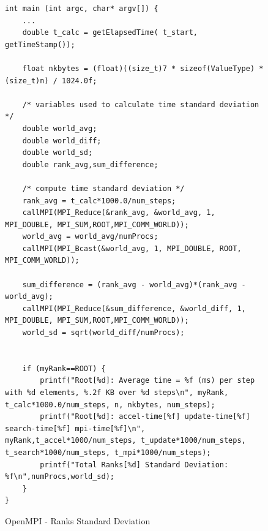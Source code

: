 \documentclass[12pt]{article} %
\begin{document}
\begin{figure}[]
\caption{OpenMPI - Ranks Standard Deviation}\label{fig:benchmark01}
\begin{lstlisting}
int main (int argc, char* argv[]) {
	...
    double t_calc = getElapsedTime( t_start, getTimeStamp());
    
    float nkbytes = (float)((size_t)7 * sizeof(ValueType) * (size_t)n) / 1024.0f;
    
    /* variables used to calculate time standard deviation */
    double world_avg;
    double world_diff;
    double world_sd;
    double rank_avg,sum_difference;
    
    /* compute time standard deviation */
    rank_avg = t_calc*1000.0/num_steps;
    callMPI(MPI_Reduce(&rank_avg, &world_avg, 1, MPI_DOUBLE, MPI_SUM,ROOT,MPI_COMM_WORLD));
    world_avg = world_avg/numProcs;
    callMPI(MPI_Bcast(&world_avg, 1, MPI_DOUBLE, ROOT, MPI_COMM_WORLD));
    
    sum_difference = (rank_avg - world_avg)*(rank_avg - world_avg);
    callMPI(MPI_Reduce(&sum_difference, &world_diff, 1, MPI_DOUBLE, MPI_SUM,ROOT,MPI_COMM_WORLD));
    world_sd = sqrt(world_diff/numProcs);
    
    
    if (myRank==ROOT) {
        printf("Root[%d]: Average time = %f (ms) per step with %d elements, %.2f KB over %d steps\n", myRank, t_calc*1000.0/num_steps, n, nkbytes, num_steps);
        printf("Root[%d]: accel-time[%f] update-time[%f] search-time[%f] mpi-time[%f]\n", myRank,t_accel*1000/num_steps, t_update*1000/num_steps, t_search*1000/num_steps, t_mpi*1000/num_steps);
        printf("Total Ranks[%d] Standard Deviation: %f\n",numProcs,world_sd);
	}
}
\end{lstlisting}
\end{figure}
\end{document}
